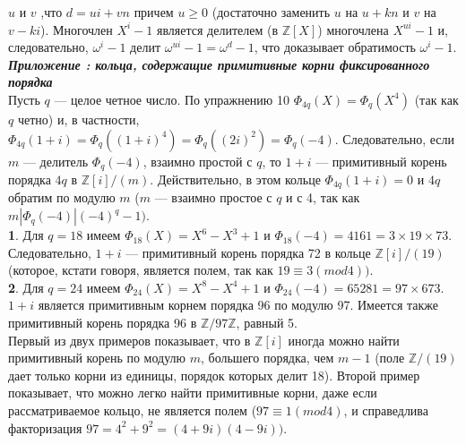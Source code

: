 \documentclass{mai_book}
\begin{document}
$u$ и $v$ ,что $d = ui+vn$ причем $u \geq 0$ (достаточно заменить $u$ на
$u+kn$ и $v$ на $v -ki$). Многочлен $X^i -1$ является делителем (в ${\mathbb{Z}}[X]$)
многочлена $X^{ui} - 1$ и, следовательно, $\omega^i - 1$ делит $\omega^{ui} -1 = \omega^d - 1$,
что доказывает обратимость $\omega^i - 1$.\\
\textbf{\textit{Приложение : кольца, содержащие примитивные корни
фиксированного порядка}}\\
Пусть $q$ — целое четное число. По упражнению 10 $\Phi_{4q}(X) = \Phi_{q}(X^4)$
(так как $q$ четно) и, в частности, $\Phi_{4q}(1+i) = \Phi_q ((1+i)^4) = \Phi_q ((2i)^2) =
\Phi_q(-4)$. Следовательно, если $m$ — делитель $\Phi_q(-4)$, взаимно простой с
$q$, то $1+i$ — примитивный корень порядка $4q$ в $\mathbb{Z} [i]/(m)$. Действительно,
в этом кольце $\Phi_{4q} (1+i)=0$ и $4q$ обратим по модулю $m$ ($m$ — взаимно
простое с $q$ и с 4, так как $m | \Phi_q (-4) | (-4)^q - 1)$.\\
\textbf{1}. Для $q = 18$ имеем $\Phi_{18} (X) = X^6 - X^3 + 1$  и  $\Phi_{18} (-4) = 4161 =
3 \times 19 \times 73$. Следовательно, $1 + i$ — примитивный корень порядка 72 в
кольце $\mathbb{Z} [i]/(19)$ (которое, кстати говоря, является полем, так как $19 \equiv 3
(mod 4))$.\\
\textbf{2}. Для $q = 24$ имеем $\Phi_{24}(X) = X^8 - X^4 + 1 $ и $ \Phi_{24} (-4) = 65 281 =
97 \times 673$. $1 + i$ является примитивным корнем порядка 96 по модулю 97.
Имеется также примитивный корень порядка 96 в $\mathbb{Z} / 97 \mathbb{Z}$, равный 5.\\
Первый из двух примеров показывает, что в $\mathbb{Z} [i]$ иногда можно 
найти примитивный корень по модулю $m$, большего порядка, чем $m - 1$
(поле $\mathbb{Z}/(19)$ дает только корни из единицы, порядок которых делит 18).
Второй пример показывает, что можно легко найти примитивные 
корни, даже если рассматриваемое кольцо, не является полем ($97 \equiv 1
(mod 4)$, и справедлива факторизация $97 = 4^2 + 9^2 = (4 + 9i)(4 - 9i))$.
\end{document}
